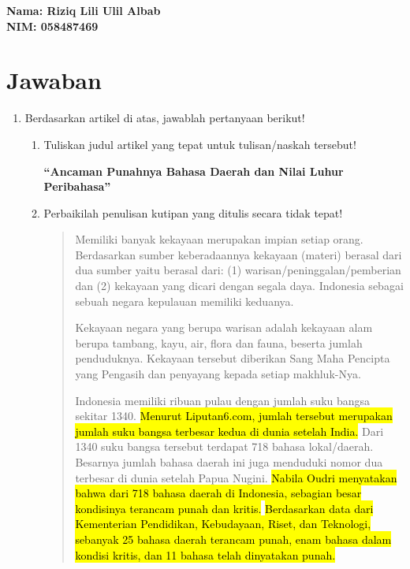\documentclass[12pt]{article}
\begin{document}
\begin{flushleft}
\textbf{Nama: Riziq Lili Ulil Albab} \\
\textbf{NIM: 058487469}
\end{flushleft}

\vspace{0.5cm}


\section*{Jawaban}
\begin{enumerate}

\item Berdasarkan artikel di atas, jawablah pertanyaan berikut!

\begin{enumerate}

\item Tuliskan judul artikel yang tepat untuk tulisan/naskah tersebut!

\textbf{“Ancaman Punahnya Bahasa Daerah dan Nilai Luhur Peribahasa”}


\vspace{0.5cm}

\item Perbaikilah penulisan kutipan yang ditulis secara tidak tepat!

\begin{quote}
Memiliki banyak kekayaan merupakan impian setiap orang. Berdasarkan sumber keberadaannya kekayaan (materi) berasal dari dua sumber yaitu berasal dari: (1) warisan/peninggalan/pemberian dan (2) kekayaan yang dicari dengan segala daya. Indonesia sebagai sebuah negara kepulauan memiliki keduanya.

Kekayaan negara yang berupa warisan adalah kekayaan alam berupa tambang, kayu, air, flora dan fauna, beserta jumlah penduduknya. Kekayaan tersebut diberikan Sang Maha Pencipta yang Pengasih dan penyayang kepada setiap makhluk-Nya.

Indonesia memiliki ribuan pulau dengan jumlah suku bangsa sekitar 1340. \hl{Menurut Liputan6.com, jumlah tersebut merupakan jumlah suku bangsa terbesar kedua di dunia setelah India.} Dari 1340 suku bangsa tersebut terdapat 718 bahasa lokal/daerah. Besarnya jumlah bahasa daerah ini juga menduduki nomor dua terbesar di dunia setelah Papua Nugini. \hl{Nabila Oudri menyatakan bahwa dari 718 bahasa daerah di Indonesia, sebagian besar kondisinya terancam punah dan kritis.} \hl{Berdasarkan data dari Kementerian Pendidikan, Kebudayaan, Riset, dan Teknologi, sebanyak 25 bahasa daerah terancam punah, enam bahasa dalam kondisi kritis, dan 11 bahasa telah dinyatakan punah.}


\end{quote}
\end{enumerate}
\end{enumerate}
\end{document}
